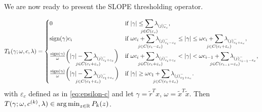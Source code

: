 We are now ready to present the SLOPE thresholding operator.

\begin{theorem}
  \label{thm:thresholding-operator}
  \[
    T_k(\gamma; \omega, c, \lambda) =
    \begin{cases}
      0                                                                                                                                                   & \text{if } |\gamma| \leq \smashoperator{\sum_{j \in C({\varepsilon_c})}} \lambda_{(j)^-_{\varepsilon_c}},                                                                                                                                                        \\
      \sign(\gamma)c_i                                                                                                                                    & \text{if } \omega c_i + \smashoperator{\sum_{j \in C(c_i - {\varepsilon_c})}} \lambda_{(j)^-_{c_i - {\varepsilon_c}}} \leq |\gamma| \leq \omega c_i + \smashoperator{\sum_{j \in C(c_i + {\varepsilon_c})}} \lambda_{(j)^-_{c_i + {\varepsilon_c}}},             \\
      \frac{\sign(\gamma)}{\omega} \bigg( |\gamma| - \smashoperator{\sum_{j \in C(c_i + {\varepsilon_c})}} \lambda_{(j)^-_{c_i + {\varepsilon_c}}} \bigg) & \text{if } \omega c_i + \smashoperator{\sum_{j \in C(c_i + {\varepsilon_c})}} \lambda_{(j)^-_{c_i + {\varepsilon_c}}} < |\gamma| < \omega c_{i - 1} + \smashoperator{\sum_{j \in C(c_{i - 1} - {\varepsilon_c})}} \lambda_{(j)^-_{c_{i - 1} - {\varepsilon_c}}}, \\
      \frac{\sign(\gamma)}{\omega} \bigg( |\gamma| - \smashoperator{\sum_{j \in C(c_1 + {\varepsilon_c})}} \lambda_{(j)^-_{c_1 + {\varepsilon_c}}} \bigg) & \text{if } |\gamma| \geq \omega c_1 + \smashoperator{\sum_{j \in C(c_1 + {\varepsilon_c})}} \lambda_{(j)^-_{c_1 + {\varepsilon_c}}}.
    \end{cases}
  \]
  with \({\varepsilon_c}\) defined as in \eqref{eq:epsilon-c} and let
  \(\gamma = \tilde{r}^Tx\), \(\omega = \tilde{x}^T\tilde{x}\). Then
  \(T(\gamma; \omega, c^{(k)}, \lambda) \in \operatorname*{arg\,min}_{z \in \mathbb{R}} P_k(z)\).
\end{theorem}
